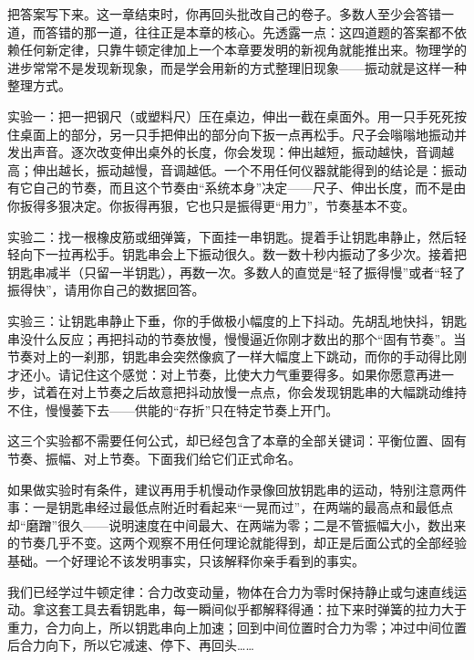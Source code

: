 把答案写下来。这一章结束时，你再回头批改自己的卷子。多数人至少会答错一道，而答错的那一道，往往正是本章的核心。先透露一点：这四道题的答案都不依赖任何新定律，只靠牛顿定律加上一个本章要发明的新视角就能推出来。物理学的进步常常不是发现新现象，而是学会用新的方式整理旧现象——振动就是这样一种整理方式。


\begin{experiment}[桌边的钢尺和弹簧上的钥匙串]
实验一：把一把钢尺（或塑料尺）压在桌边，伸出一截在桌面外。用一只手死死按住桌面上的部分，另一只手把伸出的部分向下扳一点再松手。尺子会嗡嗡地振动并发出声音。逐次改变伸出桌外的长度，你会发现：伸出越短，振动越快，音调越高；伸出越长，振动越慢，音调越低。一个不用任何仪器就能得到的结论是：振动有它自己的节奏，而且这个节奏由“系统本身”决定——尺子、伸出长度，而不是由你扳得多狠决定。你扳得再狠，它也只是振得更“用力”，节奏基本不变。

实验二：找一根橡皮筋或细弹簧，下面挂一串钥匙。提着手让钥匙串静止，然后轻轻向下一拉再松手。钥匙串会上下振动很久。数一数十秒内振动了多少次。接着把钥匙串减半（只留一半钥匙），再数一次。多数人的直觉是“轻了振得慢”或者“轻了振得快”，请用你自己的数据回答。

实验三：让钥匙串静止下垂，你的手做极小幅度的上下抖动。先胡乱地快抖，钥匙串没什么反应；再把抖动的节奏放慢，慢慢逼近你刚才数出的那个“固有节奏”。当节奏对上的一刹那，钥匙串会突然像疯了一样大幅度上下跳动，而你的手动得比刚才还小。请记住这个感觉：对上节奏，比使大力气重要得多。如果你愿意再进一步，试着在对上节奏之后故意把抖动放慢一点点，你会发现钥匙串的大幅跳动维持不住，慢慢萎下去——供能的“存折”只在特定节奏上开门。
\end{experiment}

这三个实验都不需要任何公式，却已经包含了本章的全部关键词：平衡位置、固有节奏、振幅、对上节奏。下面我们给它们正式命名。

如果做实验时有条件，建议再用手机慢动作录像回放钥匙串的运动，特别注意两件事：一是钥匙串经过最低点附近时看起来“一晃而过”，在两端的最高点和最低点却“磨蹭”很久——说明速度在中间最大、在两端为零；二是不管振幅大小，数出来的节奏几乎不变。这两个观察不用任何理论就能得到，却正是后面公式的全部经验基础。一个好理论不该发明事实，只该解释你亲手看到的事实。


我们已经学过牛顿定律：合力改变动量，物体在合力为零时保持静止或匀速直线运动。拿这套工具去看钥匙串，每一瞬间似乎都解释得通：拉下来时弹簧的拉力大于重力，合力向上，所以钥匙串向上加速；回到中间位置时合力为零；冲过中间位置后合力向下，所以它减速、停下、再回头……

